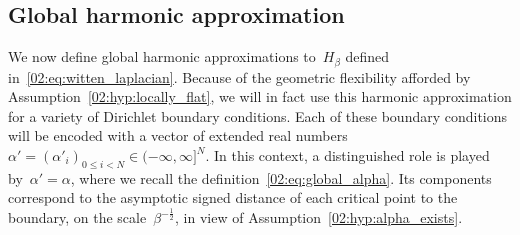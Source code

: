     \begin{table}
        \caption[]{Notations used in the definition of the harmonic approximation}
        \label{02:tab:harm_notation}
    \end{table}

    \subsection{Global harmonic approximation}\label{02:subsec:global_harm_operator}
    We now define global harmonic approximations to~$H_\beta$ defined in~\eqref{02:eq:witten_laplacian}. Because of the geometric flexibility afforded by Assumption~\eqref{02:hyp:locally_flat}, we will in fact use this harmonic approximation for a variety of Dirichlet boundary conditions. Each of these boundary conditions will be encoded with a vector of extended real numbers~$\alpha' = (\alpha'_i)_{0\leq i <N} \in (-\infty,\infty]^{N}$.
    In this context, a distinguished role is played by~$\alpha'=\alpha$, where we recall the definition~\eqref{02:eq:global_alpha}.
    Its components correspond to the asymptotic signed distance of each critical point to the boundary, on the scale~$\beta^{-\frac12}$, in view of Assumption~\eqref{02:hyp:alpha_exists}.
    
